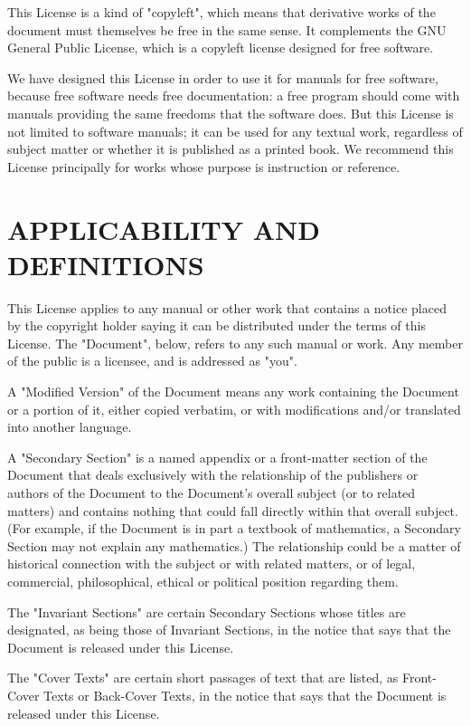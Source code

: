 This License is a kind of "copyleft", which means that derivative works
of the document must themselves be free in the same sense. It
complements the GNU General Public License, which is a copyleft license
designed for free software.

We have designed this License in order to use it for manuals for free
software, because free software needs free documentation: a free program
should come with manuals providing the same freedoms that the software
does. But this License is not limited to software manuals; it can be
used for any textual work, regardless of subject matter or whether it is
published as a printed book. We recommend this License principally for
works whose purpose is instruction or reference.

\section{APPLICABILITY AND DEFINITIONS}\label{gfdl-1}

This License applies to any manual or other work that contains a notice
placed by the copyright holder saying it can be distributed under the
terms of this License. The "Document", below, refers to any such manual
or work. Any member of the public is a licensee, and is addressed as
"you".

A "Modified Version" of the Document means any work containing the
Document or a portion of it, either copied verbatim, or with
modifications and/or translated into another language.

A "Secondary Section" is a named appendix or a front-matter section of
the Document that deals exclusively with the relationship of the
publishers or authors of the Document to the Document's overall subject
(or to related matters) and contains nothing that could fall directly
within that overall subject. (For example, if the Document is in part a
textbook of mathematics, a Secondary Section may not explain any
mathematics.) The relationship could be a matter of historical
connection with the subject or with related matters, or of legal,
commercial, philosophical, ethical or political position regarding them.

The "Invariant Sections" are certain Secondary Sections whose titles are
designated, as being those of Invariant Sections, in the notice that
says that the Document is released under this License.

The "Cover Texts" are certain short passages of text that are listed, as
Front-Cover Texts or Back-Cover Texts, in the notice that says that the
Document is released under this License.

